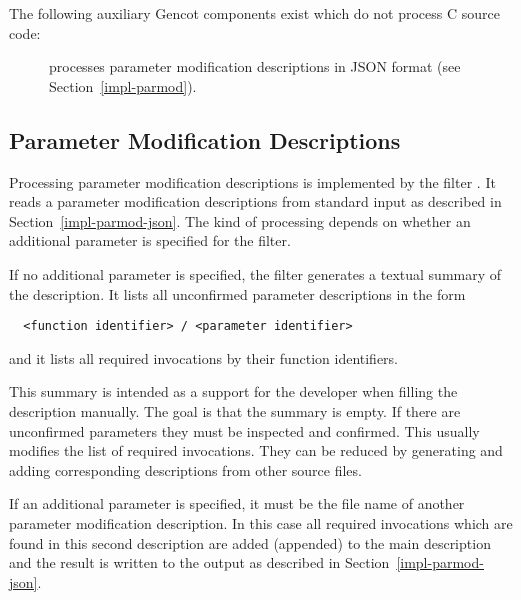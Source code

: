 The following auxiliary Gencot components exist which do not process C source code:
\begin{description}
\item[] processes parameter modification descriptions in JSON format (see Section~\ref{impl-parmod}).
\end{description}

\subsection{Parameter Modification Descriptions}

Processing parameter modification descriptions is implemented by the filter . It reads a parameter
modification descriptions from standard input as described in Section~\ref{impl-parmod-json}. The kind of processing
depends on whether an additional parameter is specified for the filter.

If no additional parameter is specified, the filter generates a textual summary of the description. It lists
all unconfirmed parameter descriptions in the form
\begin{verbatim}
  <function identifier> / <parameter identifier>
\end{verbatim}
and it lists all required invocations by their function identifiers.

This summary is intended as a support for the developer when filling the description manually. The goal is that
the summary is empty. If there are unconfirmed parameters they must be inspected and confirmed. This usually 
modifies the list of required invocations. They can be reduced by generating and adding corresponding descriptions
from other source files.

If an additional parameter is specified, it must be the file name of another parameter modification description.
In this case all required invocations which are found in this second description are added (appended) to the main 
description and the result is written to the output as described in Section~\ref{impl-parmod-json}.
